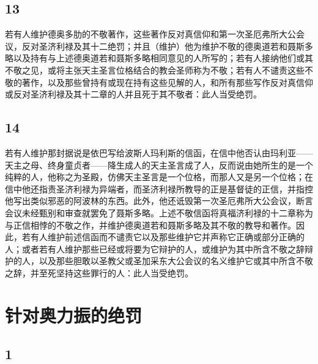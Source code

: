 
\subsection{13}

若有人维护德奥多肋的不敬著作，这些著作反对真信仰和第一次圣厄弗所大公会议，反对圣济利禄及其十二绝罚；并且（维护）他为维护不敬的德奥道若和聂斯多略以及持有与上述德奥道若和聂斯多略相同意见的人所写的；若有人接纳他们或其不敬之见，或将主张天主圣言位格结合的教会圣师称为不敬；若有人不谴责这些不敬的著作，以及那些曾持有或现在持有这些见解的人，和所有那些写作反对真信仰或反对圣济利禄及其十二章的人并且死于其不敬者：此人当受绝罚。\par


\subsection{14}

若有人维护那封据说是依巴写给波斯人玛利斯的信函，在信中他否认由玛利亚——天主之母、终身童贞者——降生成人的天主圣言成了人，反而说由她所生的是一个纯粹的人，他称之为圣殿，仿佛天主圣言是一个位格，而那人又是另一个位格；在信中他还指责圣济利禄为异端者，而圣济利禄所教导的正是基督徒的正信，并指控他写出类似邪恶的阿波林的东西。此外，他还诋毁第一次圣厄弗所大公会议，断言会议未经甄别和审查就罢免了聂斯多略。上述不敬信函将真福济利禄的十二章称为与正信相悖的不敬之作，并维护德奥道若和聂斯多略及其不敬的教导和著作。因此，若有人维护前述信函而不谴责它以及那些维护它并声称它正确或部分正确的人；或者若有人维护那些已经或将要为它辩护的人，或维护为其中所含不敬之辞辩护的人，以及那些胆敢以圣教父或圣加采东大公会议的名义维护它或其中所含不敬之辞，并至死坚持这些罪行的人：此人当受绝罚。\par


\section{针对奥力振的绝罚}


\subsection{1}

